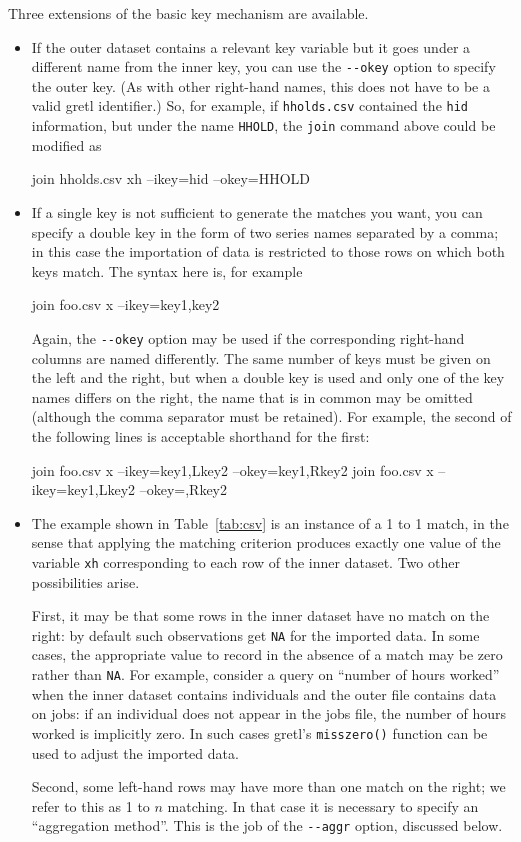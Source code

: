 Three extensions of the basic key mechanism are available.
\begin{itemize}
\item If the outer dataset contains a relevant key variable but it
  goes under a different name from the inner key, you can use the
  \verb|--okey| option to specify the outer key. (As with other
  right-hand names, this does not have to be a valid gretl
  identifier.) So, for example, if \texttt{hholds.csv} contained the
  \texttt{hid} information, but under the name \texttt{HHOLD}, the
  \texttt{join} command above could be modified as
  \begin{code}
  join hholds.csv xh --ikey=hid --okey=HHOLD
  \end{code}

\item If a single key is not sufficient to generate the matches you
  want, you can specify a double key in the form of two series names
  separated by a comma; in this case the importation of data is
  restricted to those rows on which both keys match. The syntax here
  is, for example
  \begin{code}
  join foo.csv x --ikey=key1,key2
  \end{code}
  Again, the \verb|--okey| option may be used if the corresponding
  right-hand columns are named differently. The same number of keys 
  must be given on the left and the right, but when a double key is
  used and only one of the key names differs on the right, the name
  that is in common may be omitted (although the comma separator must
  be retained). For example, the second of the following lines is
  acceptable shorthand for the first:
  \begin{code}
  join foo.csv x --ikey=key1,Lkey2 --okey=key1,Rkey2
  join foo.csv x --ikey=key1,Lkey2 --okey=,Rkey2
  \end{code}

\item The example shown in Table~\ref{tab:csv} is an instance of a 1
  to 1 match, in the sense that applying the matching criterion
  produces exactly one value of the variable \texttt{xh} corresponding
  to each row of the inner dataset. Two other possibilities arise.

  First, it may be that some rows in the inner dataset have no match
  on the right: by default such observations get \texttt{NA} for the
  imported data. In some cases, the appropriate value to record in the
  absence of a match may be zero rather than \texttt{NA}. For example,
  consider a query on ``number of hours worked'' when the inner
  dataset contains individuals and the outer file contains data on
  jobs: if an individual does not appear in the jobs file, the number
  of hours worked is implicitly zero. In such cases gretl's
  \texttt{misszero()} function can be used to adjust the imported
  data.

  Second, some left-hand rows may have more than one match on the
  right; we refer to this as 1 to $n$ matching. In that case it is
  necessary to specify an ``aggregation method''. This is the job
  of the \verb|--aggr| option, discussed below.

\end{itemize}

